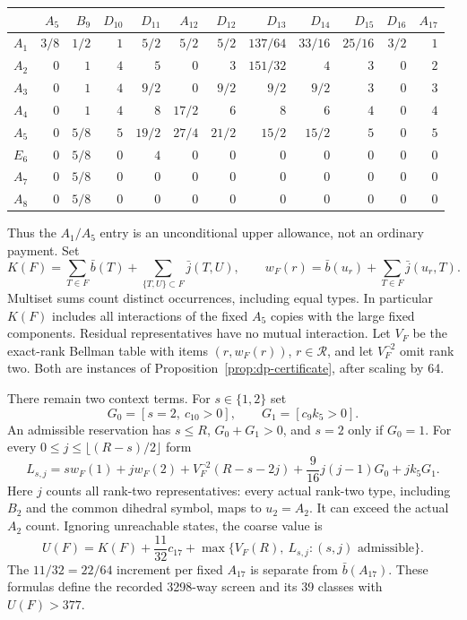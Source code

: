 \begin{center}
\begingroup\small\setlength{\tabcolsep}{3pt}
\begin{tabular}{c*{11}{r}}
\toprule
&$A_5$&$B_9$&$D_{10}$&$D_{11}$&$A_{12}$&$D_{12}$&$D_{13}$&$D_{14}$&$D_{15}$&$D_{16}$&$A_{17}$\\
\midrule
$A_1$&$3/8$&$1/2$&$1$&$5/2$&$5/2$&$5/2$&$137/64$&$33/16$&$25/16$&$3/2$&$1$\\
$A_2$&$0$&$1$&$4$&$5$&$0$&$3$&$151/32$&$4$&$3$&$0$&$2$\\
$A_3$&$0$&$1$&$4$&$9/2$&$0$&$9/2$&$9/2$&$9/2$&$3$&$0$&$3$\\
$A_4$&$0$&$1$&$4$&$8$&$17/2$&$6$&$8$&$6$&$4$&$0$&$4$\\
$A_5$&$0$&$5/8$&$5$&$19/2$&$27/4$&$21/2$&$15/2$&$15/2$&$5$&$0$&$5$\\
$E_6$&$0$&$5/8$&$0$&$4$&$0$&$0$&$0$&$0$&$0$&$0$&$0$\\
$A_7$&$0$&$5/8$&$0$&$0$&$0$&$0$&$0$&$0$&$0$&$0$&$0$\\
$A_8$&$0$&$5/8$&$0$&$0$&$0$&$0$&$0$&$0$&$0$&$0$&$0$\\
\bottomrule
\end{tabular}
\endgroup
\end{center}
Thus the $A_1/A_5$ entry is an unconditional upper allowance, not an
ordinary payment. Set
\[
 K(F)=\sum_{T\in F}\bar b(T)
           +\sum_{\{T,U\}\subset F}\bar j(T,U),\qquad
 w_F(r)=\bar b(u_r)+\sum_{T\in F}\bar j(u_r,T).
\]
Multiset sums count distinct occurrences, including equal types. In
particular $K(F)$ includes all interactions of the fixed $A_5$ copies
with the large fixed components. Residual representatives have no mutual
interaction. Let $V_F$ be the exact-rank Bellman table with items
$(r,w_F(r))$, $r\in\mathcal R$, and let $V_F^{\neg2}$ omit rank two.
Both are instances of Proposition~\ref{prop:dp-certificate}, after scaling
by 64.

There remain two context terms. For $s\in\{1,2\}$ set
\[
 G_0=[s=2,\ c_{10}>0],\qquad G_1=[c_9k_5>0].
\]
An admissible reservation has $s\le R$, $G_0+G_1>0$, and $s=2$ only if
$G_0=1$. For every $0\le j\le\lfloor(R-s)/2\rfloor$ form
\[
 L_{s,j}=s w_F(1)+j w_F(2)+V_F^{\neg2}(R-s-2j)
                 +\frac9{16}j(j-1)G_0+jk_5G_1.
\]
Here $j$ counts all rank-two representatives: every actual rank-two
type, including $B_2$ and the common dihedral symbol, maps to $u_2=A_2$.
It can exceed the actual $A_2$ count. Ignoring unreachable states, the
coarse value is
\begin{equation}\label{eq:coarse-screen-value}
 U(F)=K(F)+\frac{11}{32}c_{17}
        +\max\bigl\{V_F(R),\ L_{s,j}: (s,j)\text{ admissible}\bigr\}.
\end{equation}
The $11/32=22/64$ increment per fixed $A_{17}$ is separate from
$\bar b(A_{17})$. These formulas define the recorded 3298-way screen
and its 39 classes with $U(F)>377$.

